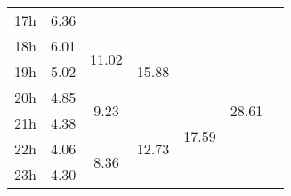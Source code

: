 \begin{center}
\begin{tabular}{l || c | c | c | c | c | c |}
17h & \multirow{1}{*}{ 6.36 }  & & & & & \\\cline{1-1}\cline{2-2}\cline{3-3}\cline{5-5}
18h & \multirow{1}{*}{ 6.01 }  & \multirow{2}{*}{ 11.02 }  & \multirow{3}{*}{ 15.88 }  & & \multirow{6}{*}{ 28.61 }  & \\\cline{1-1}
19h & \multirow{1}{*}{ 5.02 }  & & & & & \\\cline{1-1}\cline{2-2}\cline{4-4}
20h & \multirow{1}{*}{ 4.85 }  & \multirow{2}{*}{ 9.23 }  & & \multirow{4}{*}{ 17.59 }  & & \\\cline{1-1}\cline{3-3}
21h & \multirow{1}{*}{ 4.38 }  & & \multirow{3}{*}{ 12.73 }  & & & \\\cline{1-1}\cline{2-2}
22h & \multirow{1}{*}{ 4.06 }  & \multirow{2}{*}{ 8.36 }  & & & & \\\cline{1-1}
23h & \multirow{1}{*}{ 4.30 }  & & & & & \\\cline{1-1}\cline{2-2}\cline{3-3}\cline{4-4}\cline{5-5}\cline{6-6}
\end{tabular}
\end{center}